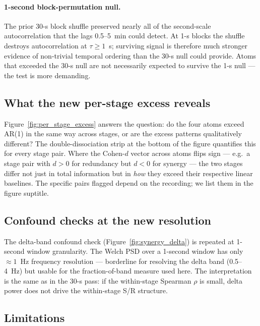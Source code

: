 \documentclass[11pt,a4paper]{article}
\begin{document}
\paragraph{1-second block-permutation null.}
The prior 30-s block shuffle preserved nearly all of the second-scale
autocorrelation that the lags 0.5--5~min could detect.  At 1-s blocks the
shuffle destroys autocorrelation at $\tau \geq 1$~s; surviving signal is
therefore much stronger evidence of non-trivial temporal ordering than the
30-s null could provide.  Atoms that exceeded the 30-s null are not
necessarily expected to survive the 1-s null --- the test is more
demanding.

\subsection{What the new per-stage excess reveals}

Figure~\ref{fig:per_stage_excess} answers the question: do the four atoms
exceed AR(1) in the same way across stages, or are the excess patterns
qualitatively different?  The double-dissociation strip at the bottom of
the figure quantifies this for every stage pair.  Where the Cohen-$d$
vector across atoms flips sign --- e.g.\ a stage pair with $d > 0$ for
redundancy but $d < 0$ for synergy --- the two stages differ not just in
total information but in \emph{how} they exceed their respective linear
baselines.  The specific pairs flagged depend on the recording; we list
them in the figure suptitle.

\subsection{Confound checks at the new resolution}

The delta-band confound check (Figure~\ref{fig:synergy_delta}) is repeated
at 1-second window granularity.  The Welch PSD over a 1-second window has
only $\approx 1$~Hz frequency resolution --- borderline for resolving the
delta band (0.5--4~Hz) but usable for the fraction-of-band measure used
here.  The interpretation is the same as in the 30-s pass: if the
within-stage Spearman $\rho$ is small, delta power does not drive the
within-stage S/R structure.

\subsection{Limitations}
\label{sec:limitations}
\end{document}
